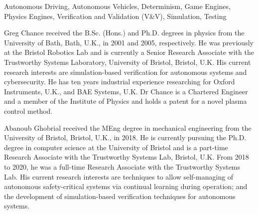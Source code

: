 \documentclass[letterpaper, 10 pt, journal, twoside]{IEEEtran}
\begin{document}
\begin{IEEEkeywords}
Autonomous Driving, Autonomous Vehicles, Determinism, Game Engines, Physics Engines,  Verification and Validation (V\&V), Simulation, Testing
\end{IEEEkeywords}
\IEEEpeerreviewmaketitle 




\printbibliography

\begin{IEEEbiography}{Greg Chance}
received the B.Sc. (Hons.) and Ph.D. degrees in physics from the University of Bath, Bath, U.K., in 2001 and 2005, respectively. He was previously at the Bristol Robotics Lab and is currently a Senior Research Associate with the Trustworthy Systems Laboratory, University of Bristol, Bristol, U.K. His current research interests are simulation-based verification for autonomous systems and cybersecurity. He has ten years industrial experience researching for Oxford Instruments, U.K., and BAE Systems, U.K. Dr Chance is a Chartered Engineer and a member of the Institute of Physics and holds a patent for a novel plasma control method. 
\end{IEEEbiography}

\begin{IEEEbiography}{Abanoub Ghobrial}
received the MEng degree in mechanical engineering from the University of Bristol, Bristol,  U.K., in 2018. He is currently pursuing the Ph.D. degree in computer science at the University of Bristol and is a part-time Research Associate with the Trustworthy Systems Lab, Bristol,  U.K. From 2018 to 2020, he was a full-time Research Associate with the Trustworthy Systems Lab. His current research interests are techniques to allow self-managing of autonomous safety-critical systems via continual learning during operation; and the development of simulation-based verification techniques for autonomous systems.
\end{IEEEbiography}
\end{document}
